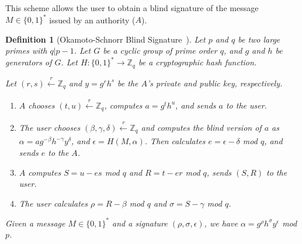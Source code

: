 \documentclass[conference]{IEEEtran}
\newtheorem{definition}{Definition}
\begin{document}
This scheme allows the user to obtain a blind signature of the message $M\in \{0,1\}^*$ issued by an authority ($A$). 

\begin{definition}[Okamoto-Schnorr Blind Signature~\cite{okamoto1992provably}]
Let $p$ and $q$ be two large primes with $q|p-1$. Let $G$ be a cyclic group of prime order $q$, and $g$ and $h$ be generators of $G$. Let $H:\{0,1\}^*\rightarrow \mathbb{Z}_q$ be a cryptographic hash function.
\begin{LaTeXdescription}
\item[Key Generation:] Let $(r,s) \xleftarrow[]{r}\mathbb{Z}_q$ and $y=g^rh^s$ be the $A$'s private and public key, respectively.
\item[Blind signature protocol:]
\begin{enumerate}
    \item $A$ chooses $(t,u) \xleftarrow[]{r}\mathbb{Z}_q$, computes $a = g^th^u$, and sends $a$ to the user.
    \item The user chooses $(\beta, \gamma, \delta) \xleftarrow[]{r}\mathbb{Z}_q$ and computes the blind version of $a$ as $\alpha=ag^{-\beta} h^{-\gamma} y^\delta$, and $\epsilon=H(M,\alpha)$. Then calculates $e=\epsilon-\delta$ mod $q$, and sends $e$ to the $A$.
    \item $A$ computes $S=u-es$ mod $q$ and $R=t-er$ mod $q$, sends $(S,R)$ to the user.
    \item The user calculates $\rho=R-\beta$ mod $q$ and $\sigma=S-\gamma$ mod $q$.
\end{enumerate}
\item[Verification:] Given a message $M\in \{0,1\}^*$ and a signature $(\rho,\sigma,\epsilon)$, we have $\alpha=g^\rho h^\sigma y^\epsilon$ mod $p$.
\end{LaTeXdescription}
\end{definition}
\end{document}
